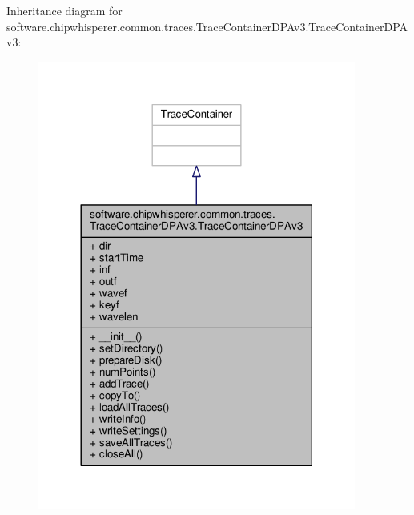 Inheritance diagram for software.\+chipwhisperer.\+common.\+traces.\+Trace\+Container\+D\+P\+Av3.\+Trace\+Container\+D\+P\+Av3\+:\nopagebreak
\begin{figure}[H]
\begin{center}
\leavevmode
\includegraphics[width=296pt]{d9/d4e/classsoftware_1_1chipwhisperer_1_1common_1_1traces_1_1TraceContainerDPAv3_1_1TraceContainerDPAv3__inherit__graph}
\end{center}
\end{figure}


